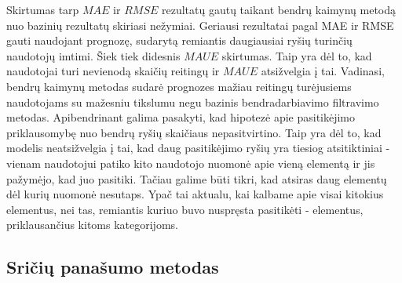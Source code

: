 \documentclass{VUMIFInfMagistrinis}
\begin{document}
Skirtumas tarp $MAE$ ir $RMSE$ rezultatų gautų taikant bendrų kaimynų metodą nuo bazinių rezultatų skiriasi nežymiai. Geriausi rezultatai pagal MAE ir RMSE gauti naudojant prognozę, sudarytą remiantis daugiausiai ryšių turinčių naudotojų imtimi. Šiek tiek didesnis $MAUE$ skirtumas. Taip yra dėl to, kad naudotojai turi nevienodą skaičių reitingų ir $MAUE$ atsižvelgia į tai. Vadinasi, bendrų kaimynų metodas sudarė prognozes mažiau reitingų turėjusiems naudotojams su mažesniu tikslumu negu bazinis bendradarbiavimo filtravimo metodas.
\newline
\indent
Apibendrinant galima pasakyti, kad hipotezė apie pasitikėjimo priklausomybę nuo bendrų ryšių skaičiaus nepasitvirtino. Taip yra dėl to, kad modelis neatsižvelgia į tai, kad daug pasitikėjimo ryšių yra tiesiog atsitiktiniai - vienam naudotojui patiko kito naudotojo nuomonė apie vieną elementą ir jis pažymėjo, kad juo pasitiki. Tačiau galime būti tikri, kad atsiras daug elementų dėl kurių nuomonė nesutaps. Ypač tai aktualu, kai kalbame apie visai kitokius elementus, nei tas, remiantis kuriuo buvo nuspręsta pasitikėti - elementus, priklausančius kitoms kategorijoms.
\subsection{Sričių panašumo metodas}
\end{document}
